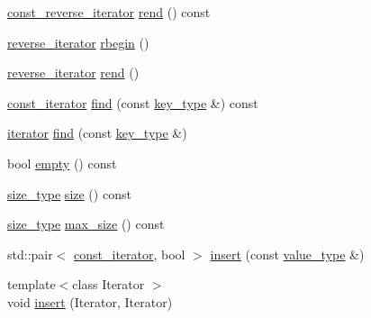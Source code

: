 \begin{DoxyCompactItemize}
\item 
\hyperlink{classnifty_1_1container_1_1FlatSet_ab7858d2e6eeeb311e21988d9b4a5b802}{const\+\_\+reverse\+\_\+iterator} \hyperlink{classnifty_1_1container_1_1FlatSet_a3cd35f340cbccbf98a7c375f663b5aaa}{rend} () const 
\item 
\hyperlink{classnifty_1_1container_1_1FlatSet_a5ad537835e3b8911ac1beed1a95d3ac2}{reverse\+\_\+iterator} \hyperlink{classnifty_1_1container_1_1FlatSet_a82523673d9285f43e73e90b37b00d105}{rbegin} ()
\item 
\hyperlink{classnifty_1_1container_1_1FlatSet_a5ad537835e3b8911ac1beed1a95d3ac2}{reverse\+\_\+iterator} \hyperlink{classnifty_1_1container_1_1FlatSet_ae40f27aa1a23e148de77b596825cb205}{rend} ()
\item 
\hyperlink{classnifty_1_1container_1_1FlatSet_a0f4cd26da060859b18742abfd534aa24}{const\+\_\+iterator} \hyperlink{classnifty_1_1container_1_1FlatSet_aca8ba8181a7cf4e25f345fdf4f89b23c}{find} (const \hyperlink{classnifty_1_1container_1_1FlatSet_a0101a4574052389646be8d9bf092a949}{key\+\_\+type} \&) const 
\item 
\hyperlink{classnifty_1_1container_1_1FlatSet_a9c7fd20cd6b1878ccb8a7e068072c795}{iterator} \hyperlink{classnifty_1_1container_1_1FlatSet_ac78650ca9a84bc0a8324a9aa03f626d4}{find} (const \hyperlink{classnifty_1_1container_1_1FlatSet_a0101a4574052389646be8d9bf092a949}{key\+\_\+type} \&)
\item 
bool \hyperlink{classnifty_1_1container_1_1FlatSet_af750b2be0c7c50855f00cff3a81d94b4}{empty} () const 
\item 
\hyperlink{classnifty_1_1container_1_1FlatSet_a06ddeba4c1be37279497ed698dfeb812}{size\+\_\+type} \hyperlink{classnifty_1_1container_1_1FlatSet_a2acd3b3f657818e1e1f72d6b8b4c9aee}{size} () const 
\item 
\hyperlink{classnifty_1_1container_1_1FlatSet_a06ddeba4c1be37279497ed698dfeb812}{size\+\_\+type} \hyperlink{classnifty_1_1container_1_1FlatSet_a232488c53074629e55716092b3c4b052}{max\+\_\+size} () const 
\item 
std\+::pair$<$ \hyperlink{classnifty_1_1container_1_1FlatSet_a0f4cd26da060859b18742abfd534aa24}{const\+\_\+iterator}, bool $>$ \hyperlink{classnifty_1_1container_1_1FlatSet_a3e59cfe8b3d5eb53750ef761cce7b652}{insert} (const \hyperlink{classnifty_1_1container_1_1FlatSet_a2366c665ec49d585ff8a77362468d82d}{value\+\_\+type} \&)
\item 
{\footnotesize template$<$class Iterator $>$ }\\void \hyperlink{classnifty_1_1container_1_1FlatSet_a2681201810070decb9eeb7f5beb47f0d}{insert} (Iterator, Iterator)

\end{DoxyCompactItemize}
